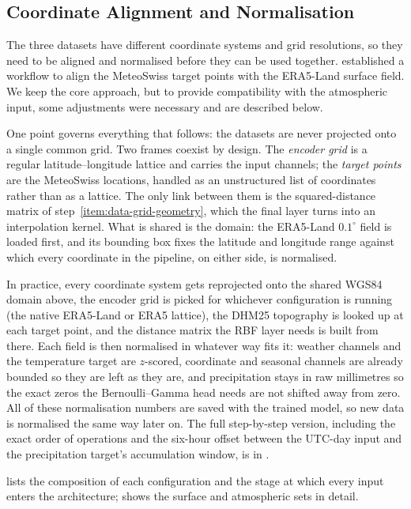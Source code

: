\subsection{Coordinate Alignment and Normalisation}\label{subsec:data-coords}
The three datasets have different coordinate systems and grid resolutions, so they need to be aligned and normalised before they can be used together. \textcite{passos} established a workflow to align the MeteoSwiss target points with the ERA5-Land surface field. We keep the core approach, but to provide compatibility with the atmospheric input, some adjustments were necessary and are described below.

One point governs everything that follows: the datasets are never projected onto a single common grid. Two frames coexist by design. The \emph{encoder grid} is a regular latitude--longitude lattice and carries the input channels; the \emph{target points} are the MeteoSwiss locations, handled as an unstructured list of coordinates rather than as a lattice. The only link between them is the squared-distance matrix of step~\ref{item:data-grid-geometry}, which the final layer turns into an interpolation kernel. What is shared is the domain: the ERA5-Land $0.1^{\circ}$ field is loaded first, and its bounding box fixes the latitude and longitude range against which every coordinate in the pipeline, on either side, is normalised.

In practice, every coordinate system gets reprojected onto the shared WGS84 domain above, the encoder grid is picked for whichever configuration is running (the native ERA5-Land or ERA5 lattice), the DHM25 topography is looked up at each target point, and the distance matrix the RBF layer needs is built from there. Each field is then normalised in whatever way fits it: weather channels and the temperature target are $z$-scored, coordinate and seasonal channels are already bounded so they are left as they are, and precipitation stays in raw millimetres so the exact zeros the Bernoulli--Gamma head needs are not shifted away from zero. All of these normalisation numbers are saved with the trained model, so new data is normalised the same way later on. The full step-by-step version, including the exact order of operations and the six-hour offset between the UTC-day input and the precipitation target's accumulation window, is in .

 lists the composition of each configuration and the stage
at which every input enters the architecture;  shows the
surface and atmospheric sets in detail.

